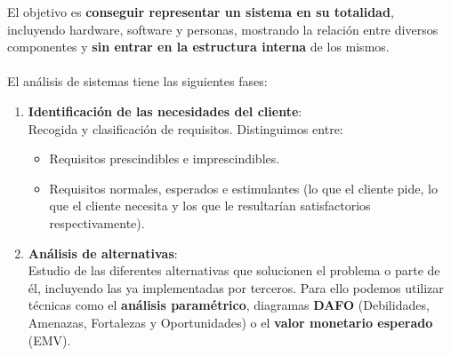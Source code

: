 El objetivo es \textbf{conseguir representar un sistema en su totalidad}, incluyendo hardware, software y personas, mostrando la relación entre diversos componentes y \textbf{sin entrar en la estructura interna} de los mismos.\\\\
El análisis de sistemas tiene las siguientes fases:
\begin{enumerate}
    \item \textbf{Identificación de las necesidades del cliente}:\\
    Recogida y clasificación de requisitos. Distinguimos entre:
    \begin{itemize}
        \item Requisitos prescindibles e imprescindibles.
        \item Requisitos normales, esperados e estimulantes (lo que el cliente pide, lo que el cliente necesita y los que le resultarían satisfactorios respectivamente). %
    \end{itemize} %
    \item \textbf{Análisis de alternativas}:\\ Estudio de las diferentes alternativas que solucionen el problema o parte de él, incluyendo las ya implementadas por terceros. Para ello podemos utilizar técnicas como el \textbf{análisis paramétrico}, diagramas \textbf{DAFO} (Debilidades, Amenazas, Fortalezas y Oportunidades) o el \textbf{valor monetario esperado} (EMV).
\begin{table}[h]
    \centering
    \caption{Análisis paramétrico de un sistema de clasificación de paquetes.}
    \label{tab:analisisParametrico}
\end{table}


\end{enumerate}
